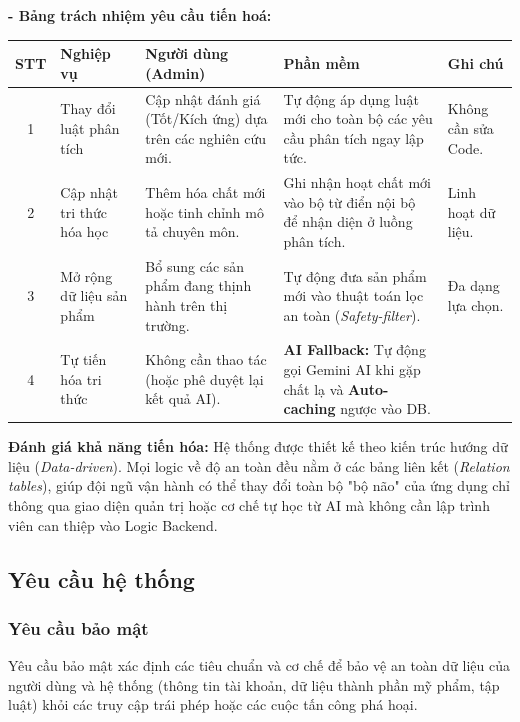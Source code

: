 \documentclass[12pt,a4paper]{article}
\begin{document}
\textbf{- Bảng trách nhiệm yêu cầu tiến hoá:}

\begin{center}
\renewcommand{\arraystretch}{1.3}
\begin{tabular}{|c|p{3cm}|p{3.5cm}|p{4cm}|p{2.5cm}|}
\hline
\rowcolor{blue!10}
\textbf{STT} & \textbf{Nghiệp vụ} & \textbf{Người dùng (Admin)} & \textbf{Phần mềm} & \textbf{Ghi chú} \\
\hline
1 & Thay đổi luật phân tích & Cập nhật đánh giá (Tốt/Kích ứng) dựa trên các nghiên cứu mới. & Tự động áp dụng luật mới cho toàn bộ các yêu cầu phân tích ngay lập tức. & Không cần sửa Code. \\
\hline
2 & Cập nhật tri thức hóa học & Thêm hóa chất mới hoặc tinh chỉnh mô tả chuyên môn. & Ghi nhận hoạt chất mới vào bộ từ điển nội bộ để nhận diện ở luồng phân tích. & Linh hoạt dữ liệu. \\
\hline
3 & Mở rộng dữ liệu sản phẩm & Bổ sung các sản phẩm đang thịnh hành trên thị trường. & Tự động đưa sản phẩm mới vào thuật toán lọc an toàn (\textit{Safety-filter}). & Đa dạng lựa chọn. \\
\hline
4 & Tự tiến hóa tri thức & Không cần thao tác (hoặc phê duyệt lại kết quả AI). & \textbf{AI Fallback:} Tự động gọi Gemini AI khi gặp chất lạ và \textbf{Auto-caching} ngược vào DB. &  \\
\hline
\end{tabular}
\end{center}

\textbf{Đánh giá khả năng tiến hóa:} 
Hệ thống được thiết kế theo kiến trúc hướng dữ liệu (\textit{Data-driven}). Mọi logic về độ an toàn đều nằm ở các bảng liên kết (\textit{Relation tables}), giúp đội ngũ vận hành có thể thay đổi toàn bộ "bộ não" của ứng dụng chỉ thông qua giao diện quản trị hoặc cơ chế tự học từ AI mà không cần lập trình viên can thiệp vào Logic Backend.

\subsection{Yêu cầu hệ thống}

\subsubsection{Yêu cầu bảo mật}
Yêu cầu bảo mật xác định các tiêu chuẩn và cơ chế để bảo vệ an toàn dữ liệu của người dùng và hệ thống (thông tin tài khoản, dữ liệu thành phần mỹ phẩm, tập luật) khỏi các truy cập trái phép hoặc các cuộc tấn công phá hoại.
\end{document}
